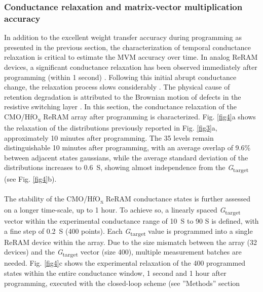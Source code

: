 \subsubsection{Conductance relaxation and matrix-vector multiplication accuracy}\label{subsubsecRelaxation}
In addition to the excellent weight transfer accuracy during programming as presented in the previous section, the characterization of temporal conductance relaxation is critical to estimate the MVM accuracy over time. In analog ReRAM devices, a significant conductance relaxation has been observed immediately after programming (within 1 second) \cite{Wan2022}. Following this initial abrupt conductance change, the relaxation process slows considerably \cite{Zhao2018,Wan2022}. The physical cause of retention degradation is attributed to the Brownian motion of defects in the resistive switching layer \cite{Zhao2018}. In this section, the conductance relaxation of the CMO/HfO\textsubscript{\textnormal{x}} ReRAM array after programming is characterized. Fig. \ref{fig4}a shows the relaxation of the distributions previously reported in Fig. \ref{fig3}a, approximately 10 minutes after programming. The 35 levels remain distinguishable 10 minutes after programming, with an average overlap of 9.6\% between adjacent states gaussians, while the average standard deviation of the distributions increases to 0.6~\textmu S, showing almost independence from the \textit{G}\textsubscript{\textnormal{target}} (see Fig. \ref{fig4}b). 
\\
\\
The stability of the CMO/HfO\textsubscript{\textnormal{x}} ReRAM conductance states is further assessed on a longer time-scale, up to 1 hour. To achieve so, a linearly spaced \textit{G}\textsubscript{\textnormal{target}} vector within the experimental conductance range of 10~\textmu S to 90 \textmu S is defined, with a fine step of 0.2~\textmu S (400 points). Each \textit{G}\textsubscript{\textnormal{target}} value is programmed into a single ReRAM device within the array. Due to the size mismatch between the array (32 devices) and the \textit{G}\textsubscript{\textnormal{target}} vector (size 400), multiple measurement batches are needed. Fig. \ref{fig4}c shows the experimental relaxation of the 400 programmed states within the entire conductance window, 1 second and 1 hour after programming, executed with the closed-loop scheme (see ”Methods” section
